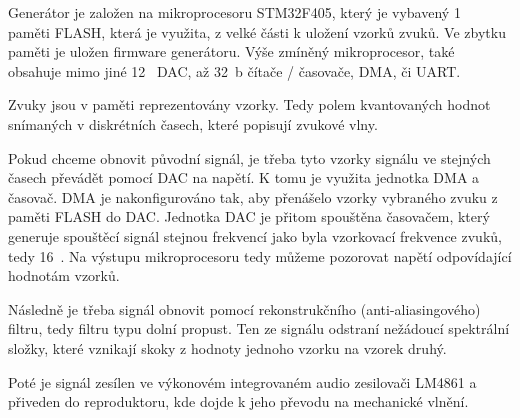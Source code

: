 Generátor je založen na mikroprocesoru STM32F405, který je vybavený 1~ paměti FLASH, která je využita, z velké části k uložení vzorků zvuků. Ve zbytku paměti je uložen firmware generátoru. Výše zmíněný mikroprocesor, také obsahuje mimo jiné 12~ DAC, až 32\jedn~{b} čítače / časovače, DMA, či
UART.

Zvuky jsou v paměti reprezentovány vzorky. Tedy polem kvantovaných hodnot snímaných v diskrétních časech, které popisují zvukové vlny.

Pokud chceme obnovit původní signál, je třeba tyto vzorky signálu ve stejných časech převádět pomocí DAC na napětí. K tomu je využita jednotka DMA a časovač. DMA je nakonfigurováno tak, aby přenášelo vzorky vybraného zvuku z paměti FLASH do DAC. Jednotka DAC je přitom spouštěna časovačem, který generuje spouštěcí signál stejnou frekvencí jako byla vzorkovací frekvence zvuků, tedy 16~. Na výstupu mikroprocesoru tedy můžeme pozorovat napětí odpovídající hodnotám vzorků.

Následně je třeba signál obnovit pomocí rekonstrukčního (anti-aliasingového) filtru, tedy filtru typu dolní propust. Ten ze signálu odstraní nežádoucí spektrální složky, které vznikají skoky z hodnoty jednoho vzorku na vzorek druhý.

Poté je signál zesílen ve výkonovém integrovaném audio zesilovači LM4861 a přiveden do reproduktoru, kde dojde k jeho převodu na mechanické vlnění.
